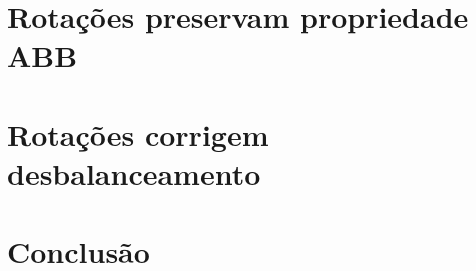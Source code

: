 \documentclass[11pt,twoside]{article}
\theoremstyle{definition}
\begin{document}
    \section{Rotações preservam propriedade ABB}

    \section{Rotações corrigem desbalanceamento}

    \section{Conclusão}




\end{document}
